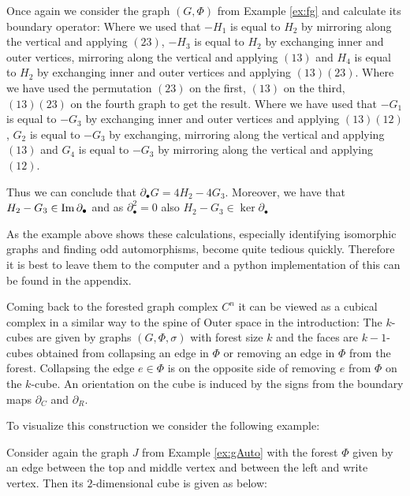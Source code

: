 \begin{eg}
	Once again we consider the graph $(G,\Phi)$ from Example \ref{ex:fg} and calculate its boundary operator:
	Where we used that $-H_{1}$ is equal to $H_{2}$ by mirroring along the vertical and applying $(2 3)$,
	$-H_{3}$ is equal to $H_2$ by exchanging inner and outer vertices, mirroring along the vertical and applying $(1 3)$ and
	$H_{4}$ is equal to $H_{2}$ by exchanging inner and outer vertices and applying $(1 3)(2 3)$.
	Where we have used the permutation $(2 3)$ on the first,  $(1 3)$ on the third, $(1 3)(2 3)$ on the fourth graph to get the result.
	Where we have used that $-G_{1}$ is equal to $-G_{3}$ by exchanging inner and outer vertices and applying $(1 3)(1 2)$,
	$G_{2}$ is equal to $-G_{3}$ by exchanging, mirroring along the vertical and applying $(1 3)$ and
	$G_{4}$ is equal to $-G_{3}$ by mirroring along the vertical and applying $(1 2)$. 

	Thus we can conclude that $\partial_{\bullet} G = 4 H_2 - 4 G_3$. Moreover, we have that $H_2 - G_3 \in \operatorname{Im} \partial_{\bullet}$ and 
	as $\partial_{\bullet}^2=0$ also $H_2 - G_3 \in \ker \partial_{\bullet}$
\end{eg}

\begin{remark}
As the example above shows these calculations, especially identifying isomorphic graphs and finding odd automorphisms, 
become quite tedious quickly. Therefore it is best to leave them to the computer and a python implementation
of this can be found in the appendix.
\end{remark}

Coming back to the forested graph complex $C^{n}$ it can be viewed as a cubical complex in a similar way to the spine of Outer space in the introduction:
The $k$-cubes are given by graphs $(G,\Phi,\sigma)$
with forest size $k$ and the faces are $k-1$-cubes obtained from collapsing an edge in $\Phi$ 
or removing an edge in $\Phi$ from the forest. Collapsing the edge $e \in \Phi$ is
on the opposite side of removing $e$ from $\Phi$ on the $k$-cube.
An orientation on the cube is induced by the signs from the boundary maps $\partial_{C}$ and $\partial_{R}$.

To visualize this construction we consider the following example:
\begin{eg}
	Consider again the graph $J$ from Example \ref{ex:gAuto} with the forest $\Phi$ given by an edge between the top and middle vertex and
	between the left and write vertex.
	Then its $2$-dimensional cube is given as below:
\end{eg}
\newpage
